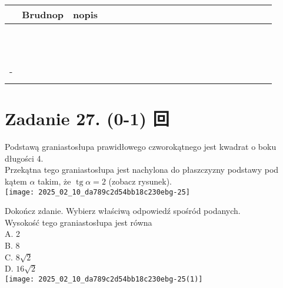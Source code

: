 \documentclass[10pt]{article}
\begin{document}
\begin{center}
\begin{tabular}{|c|c|c|c|c|c|c|c|c|c|c|c|c|c|c|c|c|c|c|c|c|}
\hline
 & Brudnop & nopis &  &  &  &  &  &  &  &  &  &  &  &  &  &  &  &  &  &  \\
\hline
 &  &  &  &  &  &  &  &  &  &  &  &  &  &  &  &  &  &  &  &  \\
\hline
 &  &  &  &  &  &  &  &  &  &  &  &  &  &  &  &  &  &  &  &  \\
\hline
 &  &  &  &  &  &  &  &  &  &  &  &  &  &  &  &  &  &  &  &  \\
\hline
 &  &  &  &  &  &  &  &  &  &  &  &  &  &  &  &  &  &  &  &  \\
\hline
 &  &  &  &  &  &  &  &  &  &  &  &  &  &  &  &  &  &  &  &  \\
\hline
 &  &  &  &  &  &  &  &  &  &  &  &  &  &  &  &  &  &  &  &  \\
\hline
 &  &  &  &  &  &  &  &  &  &  &  &  &  &  &  &  &  &  &  &  \\
\hline
 &  &  &  &  &  &  &  &  &  &  &  &  &  &  &  &  &  &  &  &  \\
\hline
 &  &  &  &  &  &  &  &  &  &  &  &  &  &  &  &  &  &  &  &  \\
\hline
 &  &  &  &  &  &  &  &  &  &  &  &  &  &  &  &  &  &  &  &  \\
\hline
 &  &  &  &  &  &  &  &  &  &  &  &  &  &  &  &  &  &  &  &  \\
\hline
- &  &  &  &  &  &  &  &  &  &  &  &  &  &  &  &  &  &  &  &  \\
\hline
 &  &  &  &  &  &  &  &  &  &  &  &  &  &  &  &  &  &  &  &  \\
\hline
\end{tabular}
\end{center}

\section*{Zadanie 27. (0-1) 回}
Podstawą graniastosłupa prawidłowego czworokątnego jest kwadrat o boku długości 4.\\
Przekątna tego graniastosłupa jest nachylona do płaszczyzny podstawy pod kątem \(\alpha\) takim, że \(\operatorname{tg} \alpha=2\) (zobacz rysunek).\\
\texttt{[image: 2025\_02\_10\_da789c2d54bb18c230ebg-25]}

Dokończ zdanie. Wybierz właściwą odpowiedź spośród podanych.\\
Wysokość tego graniastosłupa jest równa\\
A. 2\\
B. 8\\
C. \(8 \sqrt{2}\)\\
D. \(16 \sqrt{2}\)\\
\texttt{[image: 2025\_02\_10\_da789c2d54bb18c230ebg-25(1)]}
\end{document}
